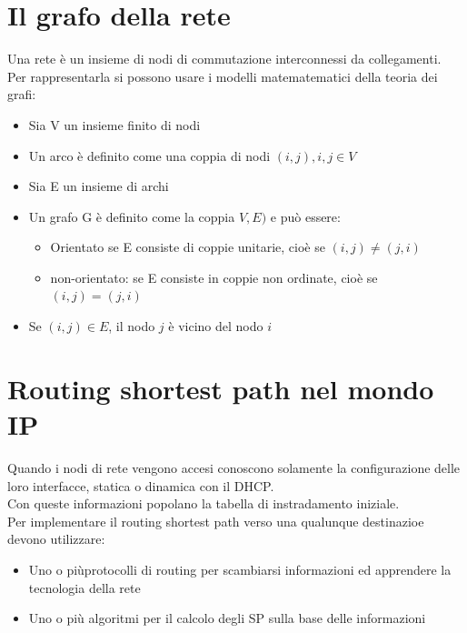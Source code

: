 \documentclass{report}
\begin{document}
        \section{Il grafo della rete}
            Una rete è un insieme di nodi di commutazione interconnessi da collegamenti.
            \\
            Per rappresentarla si possono usare i modelli matematematici della teoria dei grafi:
            \begin{itemize}
                \item Sia V un insieme finito di nodi 
                \item Un arco è definito come una coppia di nodi $(i,j), i,j\in V$
                \item Sia E un insieme di archi
                \item Un grafo G è definito come la coppia $V,E)$ e può essere:
                \begin{itemize}
                    \item Orientato se E consiste di coppie unitarie, cioè se $(i,j)\ne (j,i)$
                    \item non-orientato: se E consiste in coppie non ordinate, cioè se  $(i,j)=(j,i)$
                \end{itemize}
                \item  Se $(i,j)\in E$, il nodo $ j$ è vicino del nodo $i$
            \end{itemize}
        \section{Routing shortest path nel mondo IP}
            Quando i nodi di rete vengono accesi conoscono solamente la configurazione delle loro interfacce, statica o dinamica con il DHCP.
            \\
            Con queste informazioni popolano la tabella di instradamento iniziale.
            \\
            Per implementare il routing shortest path verso una qualunque destinazioe devono utilizzare:
            \begin{itemize}
                \item Uno o piùprotocolli di routing per scambiarsi informazioni ed apprendere la tecnologia della rete
                \item Uno o più algoritmi per il calcolo degli SP sulla base delle informazioni
            \end{itemize}
\end{document}
